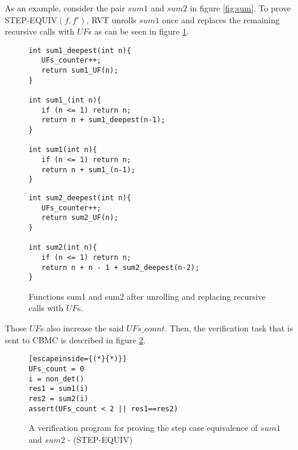 As an example, consider the pair $sum1$ and $sum2$ in figure \ref{fig:sum}. To prove STEP-EQUIV$(f,f')$, RVT unrolls $sum1$ once and replaces the remaining recursive calls with $UF$s as can be seen in figure \ref{fig:sumUnrolled}.
\begin{figure}[h]
\begin{center}
\begin{minipage}{7 cm}
\begin{lstlisting}
int sum1_deepest(int n){
   UFs_counter++;
   return sum1_UF(n);
}

int sum1_(int n){
   if (n <= 1) return n;
   return n + sum1_deepest(n-1);
}

int sum1(int n){
   if (n <= 1) return n;
   return n + sum1_(n-1);
}
\end{lstlisting}
\end{minipage}
\begin{minipage}{7 cm}
\begin{lstlisting}
int sum2_deepest(int n){
   UFs_counter++;
   return sum2_UF(n);
}

int sum2(int n){
   if (n <= 1) return n;
   return n + n - 1 + sum2_deepest(n-2);
}
\end{lstlisting}
\end{minipage}
\caption{Functions sum1 and sum2 after unrolling and replacing recursive calls with $UF$s.}
\label{fig:sumUnrolled}
\end{center}
\end{figure} 
Those $UF$s also increase the said $UFs\_count$. Then, the verification task that is sent to CBMC is described in figure \ref{fig:rvtstepcase}.

\begin{figure} [h]
\begin{center}
\begin{minipage}{7 cm}
\begin{lstlisting}[escapeinside={(*}{*)}]
UFs_count = 0
i = non_det()
res1 = sum1(i)
res2 = sum2(i)
assert(UFs_count < 2 || res1==res2)
\end{lstlisting}
\end{minipage}
\caption{A verification program for proving the step case equivalence of $sum1$ and $sum2$ - (STEP-EQUIV)}
\label{fig:rvtstepcase}
\end{center}
\end{figure}

